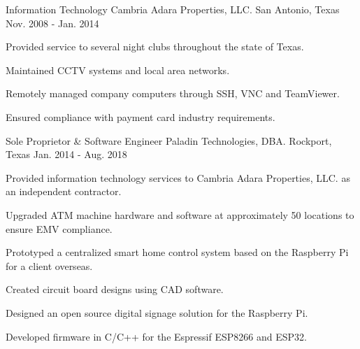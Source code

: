 

\begin{cventries}

  \cventry
    {Information Technology} %
    {Cambria Adara Properties, LLC.} %
    {San Antonio, Texas} %
    {Nov. 2008 - Jan. 2014} %
    {
      \begin{cvitems} %
        \item {
			Provided service to several night clubs throughout the
			state of Texas.
		}
        \item {
			Maintained CCTV systems and local area networks.
		}
		\item {
			Remotely managed company computers through SSH, VNC and
			TeamViewer.
		}
		\item {
			Ensured compliance with payment card industry
			requirements.
		}
      \end{cvitems}
    }

  \cventry
    {Sole Proprietor \& Software Engineer} %
    {Paladin Technologies, DBA.} %
    {Rockport, Texas} %
    {Jan. 2014 - Aug. 2018} %
    {
      \begin{cvitems} %
        \item {
			Provided information technology services to Cambria
			Adara Properties, LLC. as an independent contractor.
		}
        \item {
			Upgraded ATM machine hardware and software at approximately
			50 locations to ensure EMV compliance.
		}
        \item {
			Prototyped a centralized smart home control system
			based on the Raspberry Pi for a client overseas.
		}
        \item {
			Created circuit board designs using CAD software.
		}
        \item {
			Designed an open source digital signage solution
			for the Raspberry Pi.
		}
        \item {
			Developed firmware in C/C++ for the Espressif
			ESP8266 and ESP32.
		}
      \end{cvitems}
    }
\end{cventries}


\begin{cvskills}
\end{cvskills}

